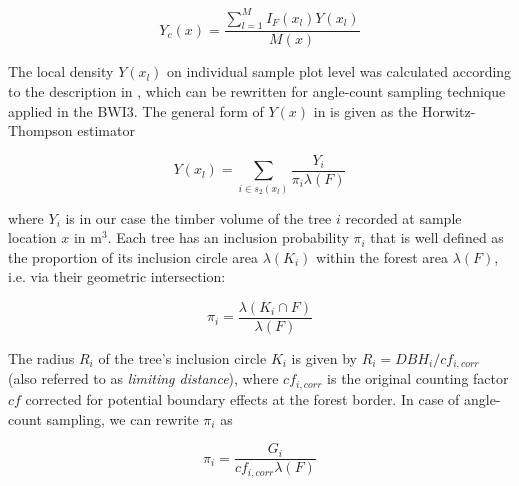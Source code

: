 \documentclass[remotesensing,article,submit,moreauthors,pdftex,10pt,a4paper]{mdpi}
\begin{document}
\begin{equation}\label{eq:locdens_clust}
Y_{c}(x) = \frac{\sum_{l=1}^{M} I_{F}(x_{l}) Y(x_l)}{M(x)}
\end{equation}

The local density $Y(x_l)$ on individual sample plot level was calculated according to the description in \citet{mandallaz2008}, which can be rewritten for angle-count sampling technique applied in the BWI3. The general form of $Y(x)$ in \citet{mandallaz2008} is given as the Horwitz-Thompson estimator 


\begin{equation}\label{eq:locdens_plot}
Y(x_l)=\sum_{i \in s_{2}(x_l)}\frac{Y_i}{\pi_{i}\lambda(F)}
\end{equation}

\noindent where $Y_i$ is in our case the timber volume of the tree $i$ recorded at sample location $x$ in m$^3$. Each tree has an inclusion probability $\pi_{i}$ that is well defined as the proportion of its inclusion circle area $\lambda(K_i)$ within the forest area $\lambda(F)$, i.e. via their geometric intersection:

%

\begin{equation}\label{locdens_plot_1}
\pi_{i} = \frac{\lambda(K_i \cap F)}{\lambda(F)}
\end{equation}

The radius $R_i$ of the tree's inclusion circle $K_i$ is given by $R_i = DBH_{i}/cf_{i,corr}$ (also referred to as \textit{limiting distance}), where $cf_{i,corr}$ is the original counting factor $cf$ corrected for potential boundary effects at the forest border. In case of angle-count sampling, we can rewrite $\pi_{i}$ as

\begin{equation}\label{eq:locdens_plot_2}
\pi_{i} = \frac{G_i}{cf_{i,corr}\lambda(F)}
\end{equation}
\end{document}
